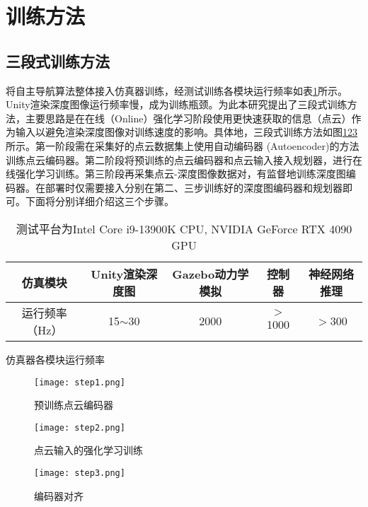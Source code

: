 \section{训练方法}
\subsection{三段式训练方法}
将自主导航算法整体接入仿真器训练，经测试训练各模块运行频率如表\ref{train_freq}所示。Unity渲染深度图像运行频率慢，成为训练瓶颈。为此本研究提出了三段式训练方法，主要思路是在在线（Online）强化学习阶段使用更快速获取的信息（点云）作为输入以避免渲染深度图像对训练速度的影响。具体地，三段式训练方法如图\ref{fig_step1}\ref{fig_step2}\ref{fig_step3}所示。第一阶段需在采集好的点云数据集上使用自动编码器 (Autoencoder)的方法训练点云编码器。第二阶段将预训练的点云编码器和点云输入接入规划器，进行在线强化学习训练。第三阶段再采集点云-深度图像数据对，有监督地训练深度图编码器。在部署时仅需要接入分别在第二、三步训练好的深度图编码器和规划器即可。下面将分别详细介绍这三个步骤。
\begin{table}
  \centering
  \begin{tabular}{ccccc}
      \hline
      \textbf{仿真模块} & \textbf{Unity渲染深度图} & \textbf{Gazebo动力学模拟} & \textbf{控制器} & \textbf{神经网络推理} \\ \hline
      运行频率（Hz） & 15$\sim$30 & 2000 & $>$1000 & $>$300 \\ \hline
  \end{tabular}
  \caption{仿真器各模块运行频率}
  \caption*{测试平台为Intel Core i9-13900K CPU, NVIDIA GeForce RTX 4090 GPU}
  \label{train_freq}
\end{table}

\begin{figure}
  \centering
  \texttt{[image: step1.png]}
  \caption{预训练点云编码器}
  \label{fig_step1}
\end{figure}

\begin{figure}
  \centering
  \texttt{[image: step2.png]}
  \caption{点云输入的强化学习训练}
  \label{fig_step2}
\end{figure}

\begin{figure}
  \centering
  \texttt{[image: step3.png]}
  \caption{编码器对齐}
  \label{fig_step3}
\end{figure}

